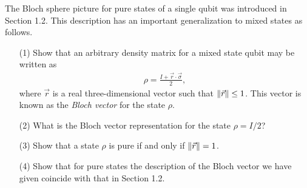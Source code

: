 \documentclass[en]{sol-man}
\begin{document}
\begin{exe}
    The Bloch sphere picture for pure states of a single qubit was introduced in Section 1.2. This description has an important generalization to mixed states as follows.
    \begin{itemize}
        \item[(1)] Show that an arbitrary density matrix for a mixed state qubit may be written as
        \begin{align}
            \rho=\frac{I+\vec{r}\cdot\vec{\sigma}}{2},
        \end{align}
        where $\vec{r}$ is a real three-dimensional vector such that $\left\lVert\vec{r}\right\rVert\leq 1$. This vector is known as the \emph{Bloch vector} for the state $\rho$.
        \item[(2)] What is the Bloch vector representation for the state $\rho=I/2$?
        \item[(3)] Show that a state $\rho$ is pure if and only if $\left\lVert\vec{r}\right\rVert=1$.
        \item[(4)] Show that for pure states the description of the Bloch vector we have given coincide with that in Section 1.2.
    \end{itemize}
\end{exe}
\end{document}
